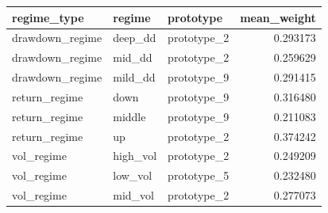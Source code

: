 \begin{tabular}{lllr}
\toprule
regime\_type & regime & prototype & mean\_weight \\
\midrule
drawdown\_regime & deep\_dd & prototype\_2 & 0.293173 \\
drawdown\_regime & mid\_dd & prototype\_2 & 0.259629 \\
drawdown\_regime & mild\_dd & prototype\_9 & 0.291415 \\
return\_regime & down & prototype\_9 & 0.316480 \\
return\_regime & middle & prototype\_9 & 0.211083 \\
return\_regime & up & prototype\_2 & 0.374242 \\
vol\_regime & high\_vol & prototype\_2 & 0.249209 \\
vol\_regime & low\_vol & prototype\_5 & 0.232480 \\
vol\_regime & mid\_vol & prototype\_2 & 0.277073 \\
\bottomrule
\end{tabular}
